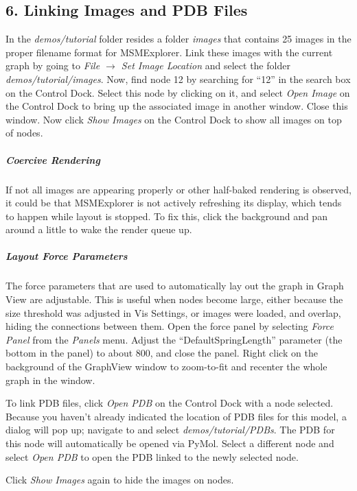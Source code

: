 \documentclass[10pt,a4paper]{report}
\begin{document}
\subsection*{6. Linking Images and PDB Files}
In the \emph{demos/tutorial} folder resides a folder \emph{images} that contains 25 images in the proper filename format for MSMExplorer. Link these images with the current graph by going to \emph{File $\rightarrow$ Set Image Location} and select the folder \emph{demos/tutorial/images}. Now, find node 12 by searching for ``12'' in the search box on the Control Dock. Select this node by clicking on it, and select \emph{Open Image} on the Control Dock to bring up the associated image in another window. Close this window. Now click \emph{Show Images} on the Control Dock to show all images on top of nodes. 

\subparagraph*{Coercive Rendering}
If not all images are appearing properly or other half-baked rendering is observed, it could be that MSMExplorer is not actively refreshing its display, which tends to happen while layout is stopped. To fix this, click the background and pan around a little to wake the render queue up.

\subparagraph*{Layout Force Parameters}
The force parameters that are used to automatically lay out the graph in Graph View are adjustable. This is useful when nodes become large, either because the size threshold was adjusted in Vis Settings, or images were loaded, and overlap, hiding the connections between them. Open the force panel by selecting \emph{Force Panel} from the \emph{Panels} menu. Adjust the ``DefaultSpringLength'' parameter (the bottom in the panel) to about 800, and close the panel. Right click on the background of the GraphView window to zoom-to-fit and recenter the whole graph in the window. 

To link PDB files, click \emph{Open PDB} on the Control Dock with a node selected. Because you haven't already indicated the location of PDB files for this model, a dialog will pop up; navigate to and select \emph{demos/tutorial/PDBs}. The PDB for this node will automatically be opened via PyMol. Select a different node and select \emph{Open PDB} to open the PDB linked to the newly selected node.

Click \emph{Show Images} again to hide the images on nodes. 
\end{document}
